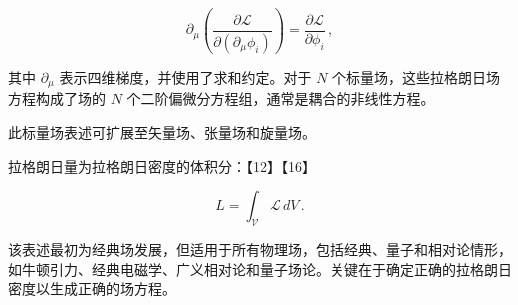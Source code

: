 \[
\partial_\mu \left( \frac{\partial \mathcal{L}}{\partial (\partial_\mu \phi_i)} \right) = \frac{\partial \mathcal{L}}{\partial \phi_i} \,,
\]

其中 \( \partial_\mu \) 表示四维梯度，并使用了求和约定。对于 \( N \) 个标量场，这些拉格朗日场方程构成了场的 \( N \) 个二阶偏微分方程组，通常是耦合的非线性方程。

此标量场表述可扩展至矢量场、张量场和旋量场。

拉格朗日量为拉格朗日密度的体积分：【12】【16】

\[
L = \int_{\mathcal{V}} \mathcal{L} \, dV \,.
\]

该表述最初为经典场发展，但适用于所有物理场，包括经典、量子和相对论情形，如牛顿引力、经典电磁学、广义相对论和量子场论。关键在于确定正确的拉格朗日密度以生成正确的场方程。
